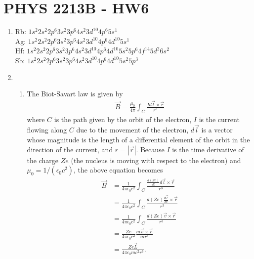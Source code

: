 \documentclass[a4paper,12pt]{article}
\begin{document}
\section*{PHYS 2213B - HW6}

\begin{enumerate}
    \item
        Rb: $1s^2 2s^2 2p^6 3s^2 3p^6 4s^2 3d^{10} 4p^6 5s^1$ \\
        Ag: $1s^2 2s^2 2p^6 3s^2 3p^6 4s^2 3d^{10} 4p^6 4d^{10} 5s^1$ \\
        Hf: $1s^2 2s^2 2p^6 3s^2 3p^6 4s^2 3d^{10} 4p^6 4d^{10} 5s^2 5p^6 4f^{14} 5d^2 6s^2$ \\
        Sb: $1s^2 2s^2 2p^6 3s^2 3p^6 4s^2 3d^{10} 4p^6 4d^{10} 5s^2 5p^3$

    \item
        \begin{enumerate}
            \item
                The Biot-Savart law is given by
                \begin{align*}
                    \vec{B} = \frac{\mu_0}{4\pi} \int_C \frac{I d\vec{l} \times \vec{r}}{r^3}
                \end{align*}
                where $C$ is the path given by the orbit of the electron, $I$ is the current flowing along $C$ due to the movement of the electron, $d\vec{l}$ is a vector whose magnitude is the length of a differential element of the orbit in the direction of the current, and $r = |\vec{r}|$. Because $I$ is the time derivative of the charge $Ze$ (the nucleus is moving with respect to the electron) and $\mu_0 = 1/(\epsilon_0 c^2)$, the above equation becomes
                \begin{align*}
                    \vec{B} &= \frac{1}{4\pi \epsilon_0 c^2} \int_C \frac{\frac{d(Ze)}{dt} d\vec{l} \times \vec{r}}{r^3} \\
                    &= \frac{1}{4\pi \epsilon_0 c^2} \int_C \frac{d(Ze) \frac{d\vec{l}}{dt} \times \vec{r}}{r^3} \\
                    &= \frac{1}{4\pi \epsilon_0 c^2} \int_C \frac{d(Ze) \vec{v} \times \vec{r}}{r^3} \\
                    &= \frac{Ze}{4\pi \epsilon_0 c^2} \frac{m\vec{v} \times \vec{r}}{mr^3} \\
                    &= \frac{Ze \vec{L}}{4\pi \epsilon_0 m c^2 r^3}.
                \end{align*}


\end{enumerate}
\end{enumerate}
\end{document}
